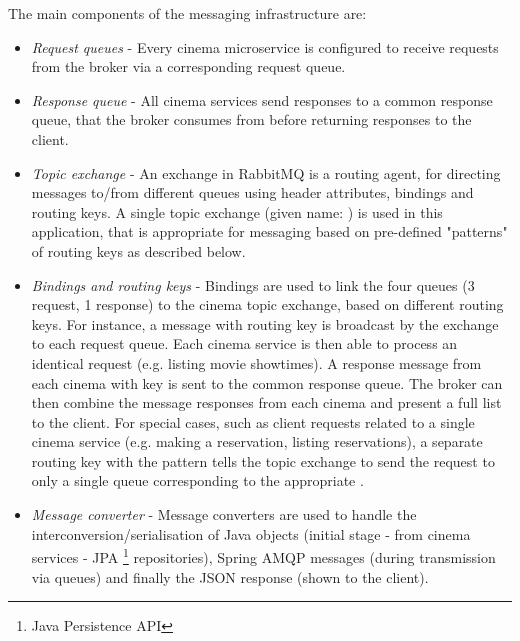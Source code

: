 The main components of the messaging infrastructure are:
\begin{itemize}
  \item \textit{Request queues} - Every cinema microservice is configured to receive requests from the broker via a corresponding request queue.
  \item \textit{Response queue} - All cinema services send responses to a common response queue, that the broker consumes from before returning responses to the client.
  \item \textit{Topic exchange} - An exchange in RabbitMQ is a routing agent, for directing messages to/from different queues using header attributes, bindings and routing keys. A single topic exchange (given name: ) is used in this application, that is appropriate for messaging based on pre-defined "patterns" of routing keys as described below.
  \item \textit{Bindings and routing keys} - Bindings are used to link the four queues (3 request, 1 response) to the cinema topic exchange, based on different routing keys. For instance, a message with routing key  is broadcast by the exchange to each request queue. Each cinema service is then able to process an identical request (e.g. listing movie showtimes). A response message from each cinema with key  is sent to the common response queue. The broker can then combine the message responses from each cinema and present a full list to the client. For special cases, such as client requests related to a single cinema service (e.g. making a reservation, listing reservations), a separate routing key with the pattern  tells the topic exchange to send the request to only a single queue corresponding to the appropriate .
  \item \textit{Message converter} - Message converters are used to handle the interconversion/serialisation of Java objects (initial stage - from cinema services - JPA \footnote{Java Persistence API} repositories), Spring AMQP messages (during transmission via queues) and finally the JSON response (shown to the client).
\end{itemize}

